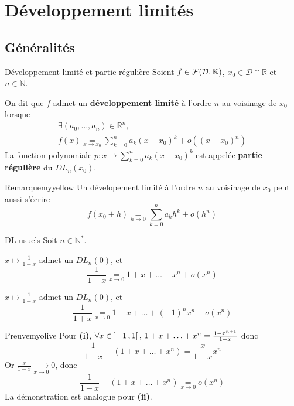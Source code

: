 \newpage

\section{Développement limités}

\subsection{Généralités}

    \begin{defi}{Développement limité et partie régulière}{}
        Soient $f \in \mathcal{F}(\mathcal{D},\mathbb{K})$, $x_0 \in \overline{\mathcal{D}} \cap \mathbb{R}$ et $n \in \mathbb{N}$. 

        On dit que $f$ admet un \textbf{développement limité} à l’ordre $n$ au voisinage de $x_0$ lorsque 
        \begin{multline*}
            \exists (a_0,\ldots,a_n) \in \mathbb{R}^n, \\
            f(x) \underset{x \rightarrow x_0}{=} \sum\limits_{k=0}^n a_k (x - x_0)^k + o\left((x-x_0)^n\right)
        \end{multline*}
        La fonction polynomiale $p : x \mapsto \sum\limits_{k=0}^n a_k (x - x_0)^k $ est appelée \textbf{partie régulière} du $DL_n(x_0)$.
    \end{defi}

    \begin{omed}{Remarque}{myyellow}
        Un dévelopement limité à l’ordre $n$ au voisinage de $x_0$ peut aussi s’écrire 
        \[ f(x_0 + h) \underset{h \rightarrow 0}{=} \sum\limits_{k=0}^n a_k h^k + o\left(h^n\right) \]
    \end{omed} 

    \begin{prop}{DL usuels}{}
        Soit $n \in \mathbb{N}^*$.
    
        \begin{alors}
            \item $x \mapsto \frac{1}{1-x}$ admet un $DL_n(0)$, et 
            \[ \frac{1}{1-x} \underset{x \rightarrow 0}{=} 1 + x + \ldots + x^n + o(x^n) \]
            \item $x \mapsto \frac{1}{1+x}$ admet un $DL_n(0)$, et 
            \[ \frac{1}{1+x} \underset{x \rightarrow 0}{=} 1 - x + \ldots + (-1)^n x^n + o(x^n)\]
        \end{alors}
    \end{prop}

    \begin{demo}{Preuve}{myolive}
        Pour \textbf{(i)}, $\forall x \in \left] -1 \, , 1 \right[, \, 1 + x + \ldots + x^n = \frac{1-x^{n+1}}{1-x}$ donc 
        \[ \frac{1}{1-x} - (1 + x +\ldots + x^n) = \frac{x}{1-x}x^n \] 
        Or $\frac{x}{1-x} \underset{x \rightarrow 0}{\longrightarrow} 0$, donc 
        \[ \frac{1}{1-x} - (1 + x +\ldots + x^n) \underset{x \rightarrow 0}{=} o(x^n) \]
        La démonstration est analogue pour \textbf{(ii)}.
    \end{demo}


